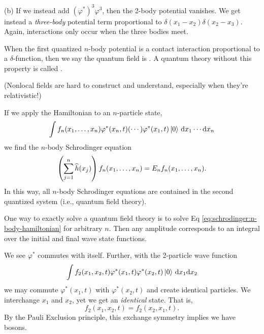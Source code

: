 (b) If we instead add $(\varphi^{*})^{3}\varphi^{3}$, then the 2-body
potential vanishes. We get instead a \emph{three-body} potential term
proportional to $\delta(x_{1}-x_{2})\delta(x_{2}-x_{3})$. Again,
interactions only occur when the three bodies meet.

\begin{defn}
When the first quantized $n$-body potential is a contact
interaction proportional to a $\delta$-function, then we say the quantum
field is . A quantum theory without this property is
called .

(Nonlocal fields are hard to construct and understand, especially when
they're relativistic!)
\end{defn}

If we apply the Hamiltonian to an $n$-particle state,
\begin{equation}
\int f_{n}(x_{1},\dots,x_{n})\varphi^{*}(x_{n},t)(\cdots)\varphi^{*}(x_{1},t)\ket{0}\,\mathrm{d}{x}_{1}
\cdots\mathrm{d}{x}_{n}
\end{equation}
we find the $n$-body Schrodinger equation
\begin{equation}\label{eq:schrodinger:n-body-hamiltonian}
\left(\sum^{n}_{j=1}\widehat{h}(x_{j})\right)f_{n}(x_{1},\dots,x_{n})=E_{n}f_{n}(x_{1},\dots,x_{n}).
\end{equation}
In this way, all $n$-body Schrodinger equations are contained in the
second quantized system (i.e., quantum field theory).

One way to exactly solve a quantum field theory is to solve Eq
\eqref{eq:schrodinger:n-body-hamiltonian} for arbitrary $n$. Then any
amplitude corresponds to an integral over the initial and final wave
state functions. 


We see $\varphi^{*}$ commutes with itself. Further, with the 2-particle
wave function 
\begin{equation*}
\int f_{2}(x_{1}, x_{2}, t)\varphi^{*}(x_{1},t)\varphi^{*}(x_{2},t)\ket{0}\,\mathrm{d}{x_{1}}\mathrm{d}{x_{2}}
\end{equation*}
we may commute $\varphi^{*}(x_{1},t)$ with $\varphi^{*}(x_{2},t)$ and
create identical particles. We interchange $x_{1}$ and $x_{2}$, yet we
get an \emph{identical} state. That is,
\begin{equation}
f_{2}(x_{1},x_{2},t) = f_{2}(x_{2},x_{1},t).
\end{equation}
By the Pauli Exclusion principle, this exchange symmetry implies we have
bosons. 

